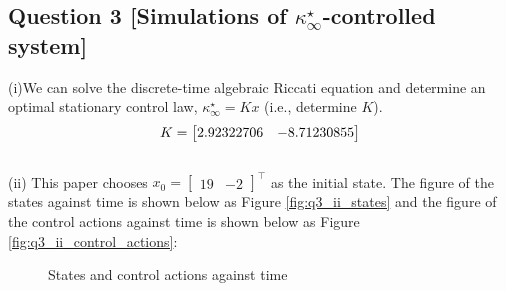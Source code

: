 \documentclass[a4paper,11pt,reqno]{amsart}
\newcommand{\tran}{\intercal}
\begin{document}
\subsection*{Question 3 [Simulations of \texorpdfstring{$\kappa ^{\star}_{\infty}$}{Lg}-controlled system]}\label{sec:q3}
(i)We can solve the discrete-time algebraic Riccati equation and
determine an optimal stationary control law, $\kappa^{\star}_{\infty}=Kx$ (i.e., determine $K$).
\begin{equation}
    K =
    \begin{bmatrix}
        2.92322706 & -8.71230855
    \end{bmatrix}
    \notag
\end{equation}
\\
(ii)
This paper chooses $x_0 = \begin{bmatrix} 19 & -2 \end{bmatrix}^{\tran}$ as the initial state. The figure of the states against time is shown below as Figure \ref{fig:q3_ii_states}
and the figure of the control actions against time is shown below as Figure \ref{fig:q3_ii_control_actions}:
\begin{figure}[H]
    \centering
    \vspace{-0.35cm}
    \subfigtopskip=2pt
    \subfigbottomskip=2pt
    \subfigcapskip=-5pt
    \quad
    \caption{States and control actions against time}
    \label{fig:q3_ii}
\end{figure}
\end{document}
